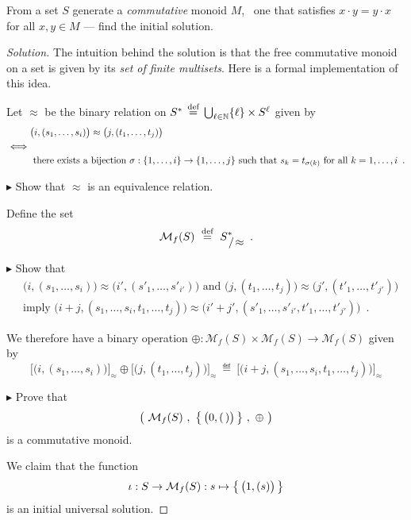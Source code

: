 \begin{exercise}
From a set $S$ generate a \textit{commutative} monoid $M$, \ie~one that
satisfies $x \cdot y = y \cdot x$ for all $x, y \in M$ --- find the initial
solution.
\end{exercise}
\begin{proof}[Solution]
The intuition behind the solution is that the free commutative monoid on a set
is given by its \emph{set of finite multisets}.  Here is a formal
implementation of this idea.

Let $\approx$ be the binary relation on
$S^\ast \,\stackrel{\text{def}}{=}\, \bigcup_{\ell\in\mathbb{N}}\{ \ell \} \times S^\ell$ given by
\begin{align*}
  & \big(i,(s_1,\ldots,s_i)\big)
  \approx
  \big(j,(t_1,\ldots,t_j)\big)
  \\
  \iff &
  \\
  &
  \text{ there exists a bijection }
  \sigma: \{ 1,\ldots,i \}\to\{ 1,\ldots,j \}
  \text{ such that } s_k = t_{\sigma(k)} \text{ for all } k = 1,\ldots,i
  \enspace.
\end{align*}

$\blacktriangleright$ Show that $\approx$ is an equivalence relation.

Define the set
\[
  \mathcal M_f(S) \ \eqdef \ S^\ast_{\,\raisebox{0mm}{$/\!\approx$}}
  \enspace.
\]

$\blacktriangleright$ Show that
\begin{align*}
  &\big(i,(s_1,\ldots,s_i)\big)
  \approx
  \big(i',(s'_1,\ldots,s'_{i'})\big)
  \text{ and }
  \big(j,(t_1,\ldots,t_j)\big)
  \approx
  \big(j',(t'_1,\ldots,t'_{j'})\big)
  \\
  &\text{imply }
  \big(i+j,(s_1,\ldots,s_i,t_1,\ldots,t_j)\big)
  \approx
  \big(i'+j',(s'_1,\ldots,s'_{i'},t'_1,\ldots,t'_{j'})\big)
  \enspace.
\end{align*}

We therefore have a binary operation
$\oplus: \mathcal M_f(S) \times \mathcal M_f(S) \to \mathcal M_f(S)$ given by
\[
  \big[\big(i,(s_1,\ldots,s_i)\big)\big]_\approx
  \oplus
  \big[\big(j,(t_1,\ldots,t_j)\big)\big]_\approx
  \ \eqdef \
  \big[\big(i+j,(s_1,\ldots,s_i,t_1,\ldots,t_j)\big)\big]_\approx
\]

$\blacktriangleright$ Prove that
\[
  \big(\
    \mathcal M_f(S)
    \ , \
    \big\{ \,\big( 0 , (\,)\big)\, \big\}
    \ , \
    \oplus
    \ \big)
\]
is a commutative monoid.

We claim that the function
\[
  \iota: S \to \mathcal M_f(S) : s \mapsto \big\{ \,\big(1,(s)\big)\, \big\}
\]
is an initial universal solution.


\end{proof}
